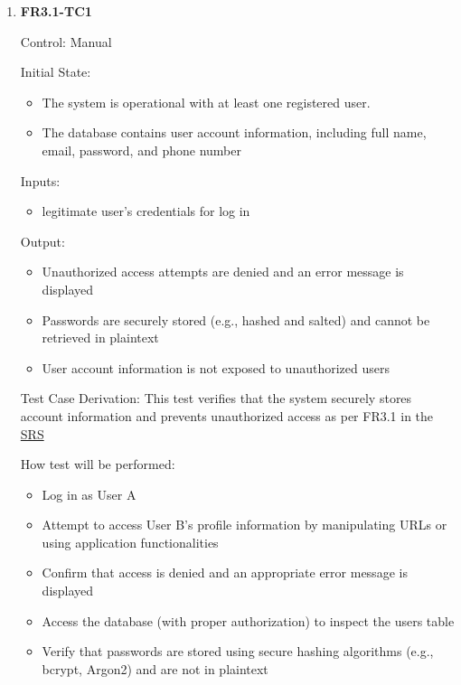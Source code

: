 \documentclass[12pt, titlepage]{article}
\begin{document}
\begin{enumerate}
    \item{\textbf{FR3.1-TC1}}
    
    Control: Manual
    
    Initial State:
    \begin{itemize}
        \item The system is operational with at least one registered user.
        \item The database contains user account information, including full name, email, password, and phone number
    \end{itemize}
    
    Inputs: 
    \begin{itemize}
        \item legitimate user's credentials for log in
    \end{itemize}
    
    Output: 
    \begin{itemize}
        \item Unauthorized access attempts are denied and an error message is displayed        
        \item Passwords are securely stored (e.g., hashed and salted) and cannot be retrieved in plaintext
        \item User account information is not exposed to unauthorized users
    \end{itemize}
    
    Test Case Derivation: This test verifies that the system securely stores account information and prevents unauthorized access as per FR3.1 in the \href{https://shorturl.at/FdAgR}{SRS}
    
    How test will be performed:
    \begin{itemize}
        \item Log in as User A
        \item Attempt to access User B's profile information by manipulating URLs or using application functionalities
        \item Confirm that access is denied and an appropriate error message is displayed
        \item Access the database (with proper authorization) to inspect the users table
        \item Verify that passwords are stored using secure hashing algorithms (e.g., bcrypt, Argon2) and are not in plaintext
    \end{itemize}
\end{enumerate}
\end{document}
